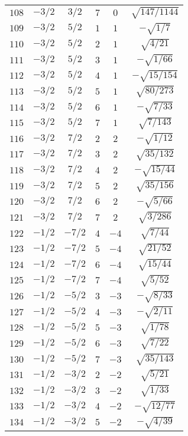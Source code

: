 \begin{table}
\begin{center}
\begin{tabular}{|c|c|c|c|c|c|}
$108$ & $-3/2$ & $3/2$ & $7$ & $0$ & $\sqrt{147/1144}$ \\ 
$109$ & $-3/2$ & $5/2$ & $1$ & $1$ & $-\sqrt{1/7}$ \\ 
$110$ & $-3/2$ & $5/2$ & $2$ & $1$ & $\sqrt{4/21}$ \\ 
$111$ & $-3/2$ & $5/2$ & $3$ & $1$ & $-\sqrt{1/66}$ \\ 
$112$ & $-3/2$ & $5/2$ & $4$ & $1$ & $-\sqrt{15/154}$ \\ 
$113$ & $-3/2$ & $5/2$ & $5$ & $1$ & $\sqrt{80/273}$ \\ 
$114$ & $-3/2$ & $5/2$ & $6$ & $1$ & $-\sqrt{7/33}$ \\ 
$115$ & $-3/2$ & $5/2$ & $7$ & $1$ & $\sqrt{7/143}$ \\ 
$116$ & $-3/2$ & $7/2$ & $2$ & $2$ & $-\sqrt{1/12}$ \\ 
$117$ & $-3/2$ & $7/2$ & $3$ & $2$ & $\sqrt{35/132}$ \\ 
$118$ & $-3/2$ & $7/2$ & $4$ & $2$ & $-\sqrt{15/44}$ \\ 
$119$ & $-3/2$ & $7/2$ & $5$ & $2$ & $\sqrt{35/156}$ \\ 
$120$ & $-3/2$ & $7/2$ & $6$ & $2$ & $-\sqrt{5/66}$ \\ 
$121$ & $-3/2$ & $7/2$ & $7$ & $2$ & $\sqrt{3/286}$ \\ 
$122$ & $-1/2$ & $-7/2$ & $4$ & $-4$ & $\sqrt{7/44}$ \\ 
$123$ & $-1/2$ & $-7/2$ & $5$ & $-4$ & $\sqrt{21/52}$ \\ 
$124$ & $-1/2$ & $-7/2$ & $6$ & $-4$ & $\sqrt{15/44}$ \\ 
$125$ & $-1/2$ & $-7/2$ & $7$ & $-4$ & $\sqrt{5/52}$ \\ 
$126$ & $-1/2$ & $-5/2$ & $3$ & $-3$ & $-\sqrt{8/33}$ \\ 
$127$ & $-1/2$ & $-5/2$ & $4$ & $-3$ & $-\sqrt{2/11}$ \\ 
$128$ & $-1/2$ & $-5/2$ & $5$ & $-3$ & $\sqrt{1/78}$ \\ 
$129$ & $-1/2$ & $-5/2$ & $6$ & $-3$ & $\sqrt{7/22}$ \\ 
$130$ & $-1/2$ & $-5/2$ & $7$ & $-3$ & $\sqrt{35/143}$ \\ 
$131$ & $-1/2$ & $-3/2$ & $2$ & $-2$ & $\sqrt{5/21}$ \\ 
$132$ & $-1/2$ & $-3/2$ & $3$ & $-2$ & $\sqrt{1/33}$ \\ 
$133$ & $-1/2$ & $-3/2$ & $4$ & $-2$ & $-\sqrt{12/77}$ \\ 
$134$ & $-1/2$ & $-3/2$ & $5$ & $-2$ & $-\sqrt{4/39}$ \\ 

\end{tabular}
\end{center}
\end{table}
